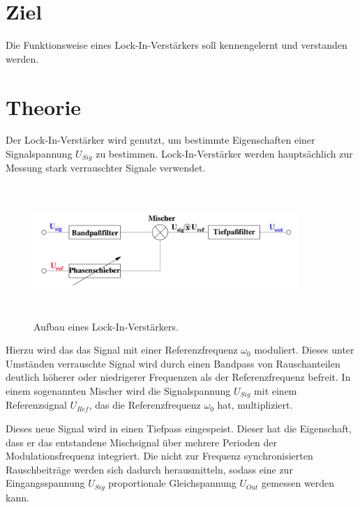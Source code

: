 \section{Ziel}
\label{sec:Ziel}

Die Funktionsweise eines Lock-In-Verstärkers soll kennengelernt und verstanden werden.%

\section{Theorie}
\label{sec:Theorie}

Der Lock-In-Verstärker wird genutzt, um bestimmte Eigenschaften einer Signalspannung 
$U_{Sig}$ zu bestimmen. Lock-In-Verstärker werden hauptsächlich zur Messung stark
verrauschter Signale verwendet.

\begin{figure}
    \centering
    \includegraphics[width=10cm, height=5cm]{build/lockin1.png}
    \caption{Aufbau eines Lock-In-Verstärkers. \cite{V303}}
\end{figure}

\noindent Hierzu wird das das Signal mit einer Referenzfrequenz $\omega_0$ moduliert.
Dieses unter Umständen verrauschte Signal wird durch einen Bandpass von Rauschanteilen 
deutlich höherer oder niedrigerer Frequenzen als der Referenzfrequenz befreit.
In einem sogenannten Mischer wird die Signalspannung $U_{Sig}$ mit einem Referenzsignal 
$U_{Ref}$, das die Referenzfrequenz $\omega_0$ hat, multipliziert. 

\noindent Dieses neue Signal wird in einen Tiefpass eingespeist. Dieser hat die 
Eigenschaft, dass er das entstandene Mischsignal über mehrere Perioden der 
Modulationsfrequenz integriert.
Die nicht zur Frequenz synchronisierten Rauschbeiträge werden sich dadurch 
herausmitteln, sodass eine zur Eingangsspannung $U_{Sig}$ proportionale Gleichspannung 
$U_{Out}$ gemessen werden kann. 

